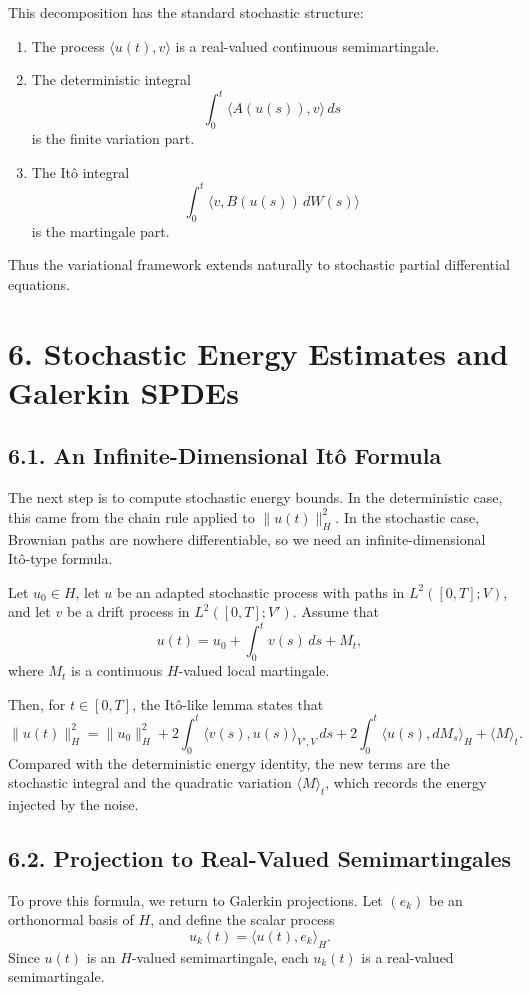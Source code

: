 \documentclass[11pt]{article}
\theoremstyle{definition}
\theoremstyle{remark}
\begin{document}
This decomposition has the standard stochastic structure:

\begin{enumerate}
\item The process \(\langle u(t),v\rangle\) is a real-valued continuous semimartingale.
\item The deterministic integral
\[
\int_0^t \langle A(u(s)),v\rangle\,ds
\]
is the finite variation part.
\item The It\^o integral
\[
\int_0^t \langle v,B(u(s))\,dW(s)\rangle
\]
is the martingale part.
\end{enumerate}

Thus the variational framework extends naturally to stochastic partial differential equations.

\section*{6. Stochastic Energy Estimates and Galerkin SPDEs}

\subsection*{6.1. An Infinite-Dimensional It\^o Formula}
The next step is to compute stochastic energy bounds. In the deterministic case, this came from the chain rule applied to \(\|u(t)\|_H^2\). In the stochastic case, Brownian paths are nowhere differentiable, so we need an infinite-dimensional It\^o-type formula.

Let \(u_0\in H\), let \(u\) be an adapted stochastic process with paths in \(L^2([0,T];V)\), and let \(v\) be a drift process in \(L^2([0,T];V')\). Assume that
\[
u(t)=u_0+\int_0^t v(s)\,ds+M_t,
\]
where \(M_t\) is a continuous \(H\)-valued local martingale.

Then, for \(t\in[0,T]\), the It\^o-like lemma states that
\[
\|u(t)\|_H^2
=
\|u_0\|_H^2
+
2\int_0^t \langle v(s),u(s)\rangle_{V',V}\,ds
+
2\int_0^t \langle u(s),dM_s\rangle_H
+
\langle M\rangle_t.
\]
Compared with the deterministic energy identity, the new terms are the stochastic integral and the quadratic variation \(\langle M\rangle_t\), which records the energy injected by the noise.

\subsection*{6.2. Projection to Real-Valued Semimartingales}
To prove this formula, we return to Galerkin projections. Let \((e_k)\) be an orthonormal basis of \(H\), and define the scalar process
\[
u_k(t)=\langle u(t),e_k\rangle_H.
\]
Since \(u(t)\) is an \(H\)-valued semimartingale, each \(u_k(t)\) is a real-valued semimartingale.
\end{document}
